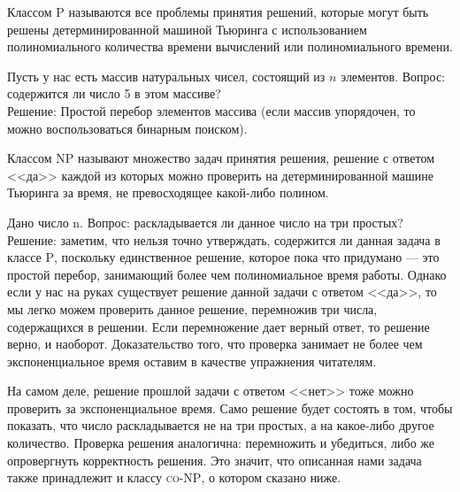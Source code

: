     
    
    \begin{Def} 
        Классом \textsc{P} называются все проблемы принятия решений, которые могут быть решены детерминированной машиной Тьюринга с использованием полиномиального количества времени вычислений или полиномиального времени.
    \end{Def}

    \begin{Example}
        Пусть у нас есть массив натуральных чисел, состоящий из $n$ элементов. Вопрос: содержится ли число 5 в этом массиве?\\
        Решение: Простой перебор элементов массива (если массив упорядочен, то можно воспользоваться бинарным поиском).
    \end{Example}
    \begin{Def}
        Классом \textsc{NP} называют множество задач принятия решения, решение с ответом <<да>> каждой из которых можно проверить на детерминированной машине Тьюринга за время, не превосходящее какой-либо полином.
    \end{Def}
    \begin{Example} 
        Дано число n. Вопрос: раскладывается ли данное число на три простых?\\
        Решение: заметим, что нельзя точно утверждать, содержится ли данная задача в классе \textsc{P}, поскольку единственное решение, которое пока что придумано --- это простой перебор, занимающий более чем полиномиальное время работы. Однако если у нас на руках существует решение данной задачи с ответом <<да>>, то мы легко можем проверить данное решение, перемножив три числа, содержащихся в решении. Если перемножение дает верный ответ, то решение верно, и наоборот. Доказательство того, что проверка занимает не более чем экспоненциальное время оставим в качестве упражнения читателям.
    \end{Example}
    \begin{Rem}
        На самом деле, решение прошлой задачи с ответом <<нет>> тоже можно проверить за экспоненциальное время. Само решение будет состоять в том, чтобы показать, что число раскладывается не на три простых, а на какое-либо другое количество. Проверка решения аналогична: перемножить и убедиться, либо же опровергнуть корректность решения. Это значит, что описанная нами задача также принадлежит и классу \textsc{co-NP}, о котором сказано ниже.
    \end{Rem}
